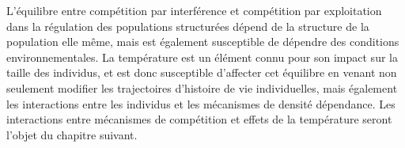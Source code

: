 L'équilibre entre compétition par interférence et compétition par exploitation
dans la régulation des populations structurées dépend de la structure de la
population elle même, mais est également susceptible de dépendre des conditions
environnementales. La température est un élément connu pour son impact sur la
taille des individus, et est donc susceptible d'affecter cet équilibre en venant
non seulement modifier les trajectoires d'histoire de vie individuelles, mais
également les interactions entre les individus et les mécanismes de densité
dépendance. Les interactions entre mécanismes de compétition et effets
de la température seront l'objet du chapitre suivant. 

